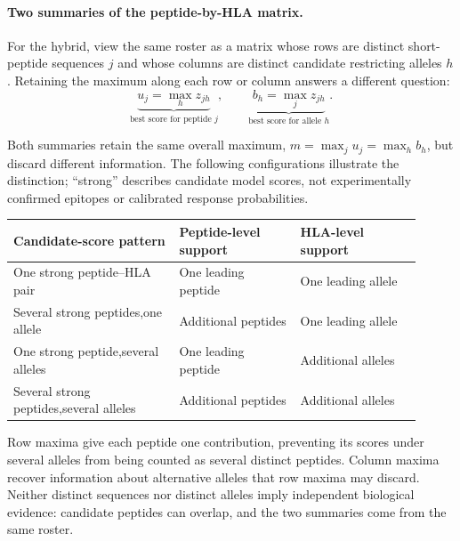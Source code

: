 \documentclass[11pt]{article}
\begin{document}
\begin{minipage}{\linewidth}
\paragraph{Two summaries of the peptide-by-HLA matrix.}
For the hybrid, view the same roster as a matrix whose rows are distinct
short-peptide sequences \(j\) and whose columns are distinct candidate
restricting alleles \(h\). Retaining the maximum along each row or column
answers a different question:
\[
\underbrace{u_j=\max_h z_{jh}}_{\text{best score for peptide }j},
\qquad
\underbrace{b_h=\max_j z_{jh}}_{\text{best score for allele }h}.
\]
\end{minipage}\par\smallskip
Both summaries retain the same overall maximum,
\(m=\max_j u_j=\max_h b_h\), but discard different information. The
following configurations illustrate the distinction; ``strong'' describes
candidate model scores, not experimentally confirmed epitopes or calibrated
response probabilities.

\begin{center}
\small
\begin{tabular}{@{}p{0.37\linewidth}p{0.27\linewidth}p{0.27\linewidth}@{}}
\toprule
Candidate-score pattern & Peptide-level support & HLA-level support \\
\midrule
One strong peptide--HLA pair
& One leading peptide & One leading allele \\
\addlinespace
Several strong peptides,\newline one allele
& Additional peptides & One leading allele \\
\addlinespace
One strong peptide,\newline several alleles
& One leading peptide & Additional alleles \\
\addlinespace
Several strong peptides,\newline several alleles
& Additional peptides & Additional alleles \\
\bottomrule
\end{tabular}
\end{center}

Row maxima give each peptide one contribution, preventing its scores under
several alleles from being counted as several distinct peptides. Column
maxima recover information about alternative alleles that row maxima may
discard. Neither distinct sequences nor distinct alleles imply independent
biological evidence: candidate peptides can overlap, and the two summaries
come from the same roster.
\end{document}
